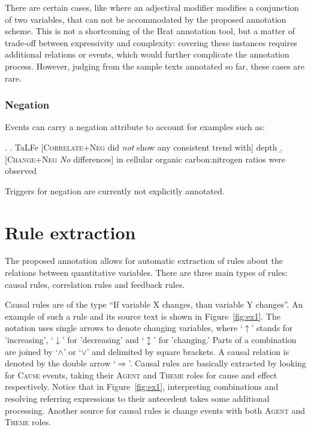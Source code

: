 \documentclass[10pt, a4paper]{article}
\newcommand{\tag}[1]{\textsc{#1}}
\begin{document}
There are certain cases, like where an adjectival modifier modifies a conjunction of two variables, that can not be accommodated by the proposed annotation scheme.
This is not a shortcoming of the Brat annotation tool, but a matter of trade-off between expressivity and complexity: covering these instances requires additional relations or events, which would further complicate the annotation process.
However, judging from the sample texts annotated so far, these cases are rare.


\subsubsection{Negation}

Events can carry a negation attribute to account for examples such as:

\exi.
  \a. TaLFe [\tag{Correlate+Neg} did \emph{not} show any consistent trend with] depth 
  \b. [\tag{Change+Neg} \emph{No} differences] in cellular organic carbon:nitrogen ratios were observed

Triggers for negation are currently not explicitly annotated.


\section{Rule extraction}
\label{sec:extraction}

The proposed annotation allows for automatic extraction of rules about the relations between quantitative variables.
There are three main types of rules: causal rules, correlation rules and feedback rules.

Causal rules are of the type ``If variable X changes, than variable Y changes''.
An example of such a rule and its source text is shown in Figure~\ref{fig:ex1}.
The notation uses single arrows to denote changing variables, where `$\uparrow$' stands for 'increasing', `$\downarrow$' for 'decreasing' and `$\updownarrow$' for 'changing.'
Parts of a combination are joined by `$\wedge$' or `$\vee$' and delimited by square brackets.
A causal relation is denoted by the double arrow `$\Longrightarrow$'.
Causal rules are basically extracted by looking for \tag{Cause} events, taking their \tag{Agent} and \tag{Theme} roles for cause and effect respectively.
Notice that in Figure~\ref{fig:ex1}, interpreting combinations and resolving referring expressions to their antecedent takes some additional processing.
Another source for causal rules is change events with both \tag{Agent} and \tag{Theme} roles.
\end{document}
